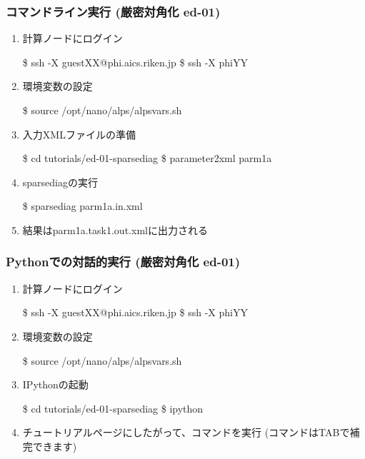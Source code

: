 \begin{frame}[fragile]
  \frametitle{コマンドライン実行 (厳密対角化 ed-01)}
  \begin{enumerate}
  \item<1-> 計算ノードにログイン
\begin{semiverbatim}
\$ ssh -X guest{\color{red}XX}@phi.aics.riken.jp
\$ ssh -X phi{\color{red}YY}
\end{semiverbatim}
  \item<1-> 環境変数の設定
\begin{semiverbatim}
\$ source /opt/nano/alps/alpsvars.sh
\end{semiverbatim}
  \item<1-> 入力XMLファイルの準備
\begin{semiverbatim}
\$ cd tutorials/ed-01-sparsediag
\$ parameter2xml parm1a
\end{semiverbatim}
  \item<1-> sparsediagの実行
\begin{semiverbatim}
\$ sparsediag parm1a.in.xml
\end{semiverbatim}
  \item<1-> 結果はparm1a.task1.out.xmlに出力される
  \end{enumerate}
\end{frame}

\begin{frame}[fragile]
  \frametitle{Pythonでの対話的実行 (厳密対角化 ed-01)}
  \begin{enumerate}
  \item<1-> 計算ノードにログイン
\begin{semiverbatim}
\$ ssh -X guest{\color{red}XX}@phi.aics.riken.jp
\$ ssh -X phi{\color{red}YY}
\end{semiverbatim}
  \item<1-> 環境変数の設定
\begin{semiverbatim}
\$ source /opt/nano/alps/alpsvars.sh
\end{semiverbatim}
  \item<1-> IPythonの起動
\begin{semiverbatim}
\$ cd tutorials/ed-01-sparsediag
\$ ipython
\end{semiverbatim}
  \item<1-> チュートリアルページにしたがって、コマンドを実行 (コマンドはTABで補完できます)
  \end{enumerate}
\end{frame}

